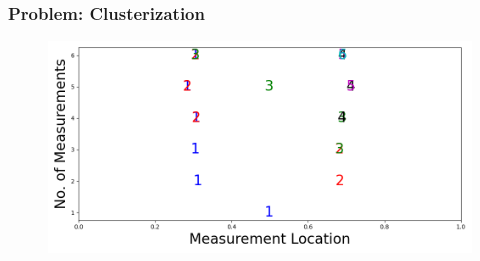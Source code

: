 \documentclass{beamer}
\begin{document}
\begin{frame}
\frametitle{Problem: Clusterization}
\begin{figure}
  \centering
  \includegraphics[height=0.5\textwidth]{figs/dst_modelError0.png}
\end{figure}

\end{frame}
\end{document}
